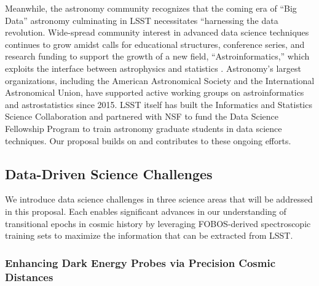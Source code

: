 \documentclass[oneside,11pt]{amsart}
\newcommand{\comment}[2][todo]{{\color{#1}[[{\bf #2}]]}}
\begin{document}
Meanwhile, the astronomy community recognizes that the coming era of ``Big Data'' astronomy culminating in LSST
necessitates ``harnessing the data revolution.  Wide-spread community interest in advanced data science techniques
continues to grow amidst calls for educational structures, conference series, and research funding to support the
growth of a new field, ``Astroinformatics,'' which exploits the interface between astrophysics and statistics
\citep{borne09}.  Astronomy's largest organizations, including the American Astronomical Society and the International
Astronomical Union, have supported active working groups on astroinformatics and astrostatistics since 2015.  LSST
itself has built the Informatics and Statistics Science Collaboration and partnered with NSF to fund the Data Science
Fellowship Program to train astronomy graduate students in data science techniques.  Our proposal builds on and
contributes to these ongoing efforts.




\subsection{Data-Driven Science Challenges}
\label{sec:goals}

We introduce data science challenges in three science areas that will be addressed in this proposal.  Each enables significant advances in our understanding of transitional epochs in cosmic history by leveraging FOBOS-derived spectroscopic training sets to maximize the information that can be extracted from LSST.

\subsubsection{Enhancing Dark Energy Probes via Precision Cosmic Distances}
\label{sec:cosmology}
\noindent \comment{1 page}
\end{document}
